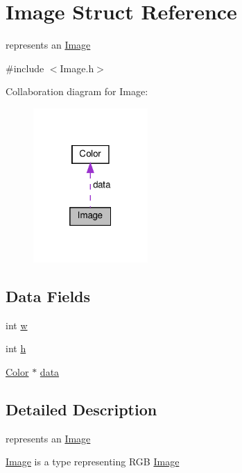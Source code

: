 \hypertarget{struct_image}{}\section{Image Struct Reference}
\label{struct_image}


represents an \hyperlink{struct_image}{Image}  




{\ttfamily \#include $<$Image.\+h$>$}



Collaboration diagram for Image\+:\nopagebreak
\begin{figure}[H]
\begin{center}
\leavevmode
\includegraphics[width=124pt]{struct_image__coll__graph}
\end{center}
\end{figure}
\subsection*{Data Fields}
\begin{DoxyCompactItemize}
\item 
int \hyperlink{struct_image_aac374e320caaadeca4874add33b62af2}{w}
\item 
int \hyperlink{struct_image_a16611451551e3d15916bae723c3f59f7}{h}
\item 
\hyperlink{struct_color}{Color} $\ast$ \hyperlink{struct_image_a17c37489ef67e6333577cec67951bc7e}{data}
\end{DoxyCompactItemize}


\subsection{Detailed Description}
represents an \hyperlink{struct_image}{Image} 

\hyperlink{struct_image}{Image} is a type representing R\+GB \hyperlink{struct_image}{Image} 

